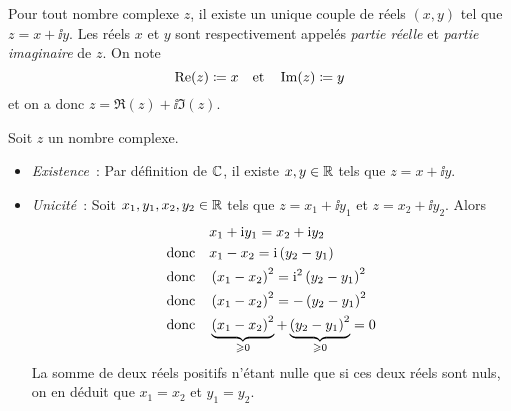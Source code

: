 \documentclass{magnoliaold}
\begin{document}
\begin{definition}[utile=-3]
  Pour tout nombre complexe $z$, il existe un unique couple de réels $(x,y)$ 
  tel que $z=x+\ii y$. Les réels $x$ et $y$ sont respectivement appelés \emph{partie réelle} et \emph{partie imaginaire} de $z$. On note
  $$\mathop{\rm Re}(z)\coloneqq x \quad \text{et} \quad \mathop{\rm Im}(z)\coloneqq y$$
et on a donc $z=\Re(z)+\ii\Im(z)$.
\end{definition}
\begin{preuve}
  Soit $z$ un nombre complexe.
  \begin{itemize}
  \item \emph{Existence}~:
    Par définition de $\mathbb{C}$, il existe $x,y\in\mathbb{R}$ tels que $z=x+\ii y$.
  \item \emph{Unicité}~:
    Soit $x_1,y_1,x_2,y_2\in\mathbb{R}$ tels que $z=x_1+\ii y_1$ et $z=x_2+\ii y_2$. Alors
    \begin{equation*}\begin{split}
    & x_1+{\rm i} y_1=x_2+{\rm i} y_2\\
    \text{donc}\quad  & x_1-x_2={\rm i}\left(y_2-y_1\right)\\
    \text{donc}\quad  & \left(x_1-x_2\right)^2={\rm i}^2\left(y_2-y_1\right)^2\\   
    \text{donc}\quad  & \left(x_1-x_2\right)^2=-\left(y_2-y_1\right)^2\\   
    \text{donc}\quad  & \underbrace{\left(x_1-x_2\right)^2}_{\geqslant 0}+
                        \underbrace{\left(y_2-y_1\right)^2}_{\geqslant 0}=0
    \end{split}\end{equation*}
    La somme de deux réels positifs n'étant nulle que si ces deux réels sont
    nuls, on en déduit que $x_1=x_2$ et $y_1=y_2$.
  \end{itemize}
\end{preuve}
\end{document}
